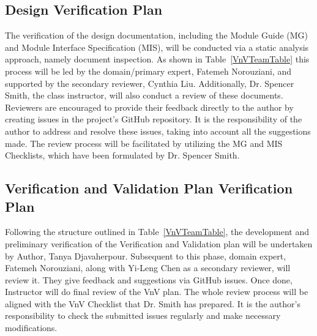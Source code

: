\documentclass[12pt, titlepage]{article}
\begin{document}


\subsection{Design Verification Plan}\label{DesignVerPlan}

The verification of the design documentation, including the Module Guide (MG) 
and Module Interface Specification (MIS), will be conducted via a static 
analysis approach, namely document inspection. As shown in Table~\ref{VnVTeamTable}
this process will be led by 
the domain/primary expert, Fatemeh Norouziani, and supported by the secondary 
reviewer, Cynthia Liu. Additionally, Dr. Spencer Smith, the class instructor, 
will also conduct a review of these documents. Reviewers are encouraged to 
provide their feedback directly to the author by creating issues in the 
project's GitHub repository. It is the responsibility of the author to 
address and resolve these issues, taking into account all the suggestions 
made. The review process will be facilitated by utilizing the 
MG \cite{MG-Checklist} and MIS \cite{MIS-checklist} 
Checklists, which have been formulated by Dr. Spencer Smith.




\subsection{Verification and Validation Plan Verification Plan}\label{VnvVerPlan}

Following the structure outlined in Table~\ref{VnVTeamTable}, the development and preliminary verification of 
the Verification and Validation plan will be undertaken by Author, Tanya Djavaherpour. 
Subsequent to this phase, domain expert, Fatemeh Norouziani, along with 
Yi-Leng Chen as a secondary reviewer, will review it. 
They give feedback and suggestions via GitHub issues. 
Once done, Instructor will do final review of the VnV plan.
The whole review process will be aligned with the 
VnV Checklist \cite{VnV-Checklist} that Dr. Smith has prepared.
It is the author’s responsibility to check the submitted issues regularly 
and make necessary modifications.
\end{document}
